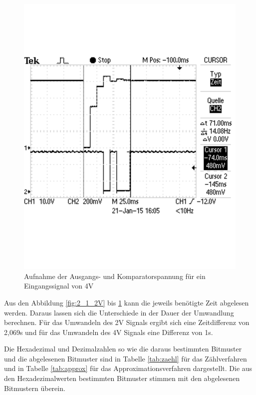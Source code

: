 \documentclass[12pt,a4paper]{article}
\begin{document}
\begin{figure}[H]
  \centering 	
    \includegraphics[trim = 0mm 50mm 0mm 50mm, clip, scale = 0.4]{2_2_4V.pdf}
  	\caption[Aufnahme der Ausgangs- und Komparatorspannung für ein Eingangssignal von 4V]{Aufnahme der Ausgangs- und Komparatorspannung für ein Eingangssignal von 4V} 
  \label{fig:2_2_4V}
\end{figure}


Aus den Abbildung \ref{fig:2_1_2V} bis \ref{fig:2_2_4V} kann die jeweils benötigte Zeit abgelesen werden. Daraus lassen sich die Unterschiede in der Dauer der Umwandlung berechnen. Für das Umwandeln des 2V Signals ergibt sich eine Zeitdifferenz von 2,069s und für das Umwandeln des 4V Signals eine Differenz von 1s.

Die Hexadezimal und Dezimalzahlen so wie die daraus bestimmten Bitmuster und die abgelesenen Bitmuster sind in Tabelle \ref{tab:zaehl} für das Zählverfahren und in Tabelle \ref{tab:approx} für das Approximationsverfahren dargestellt. Die aus den Hexadezimalwerten bestimmten Bitmuster stimmen mit den abgelesenen Bitmustern überein.
\end{document}

